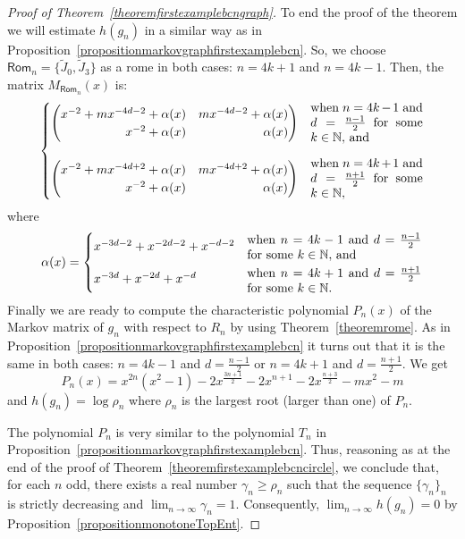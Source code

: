 \documentclass[a4paper, 11pt]{amsart}
\numberwithin{equation}{section}
\theoremstyle{customnumberedtheorem}
\theoremstyle{definitionwithbfnote}
\newcommand{\N}{\ensuremath{\mathbb{N}}}
\begin{document}
\begin{proof}[Proof of Theorem~\ref{theoremfirstexamplebcngraph}]
To end the proof of the theorem we will estimate $h(g_n)$
in a similar way as in
Proposition~\ref{propositionmarkovgraphfirstexamplebcn}.
So, we  choose
$\textsf{Rom}_n = \{\widetilde{J}_0, \widetilde{J}_3\}$
as a rome in both cases: $n = 4k + 1$ and $n = 4k - 1.$
Then, the matrix $M_{\textsf{Rom}_n}(x)$ is:
\[
 \begin{cases}
   \begin{pmatrix*}[r]
        x^{-2} + m x^{-4d-2} +\alpha(x) & m x^{-4d-2} +\alpha(x)\\
        x^{-2}  +\alpha(x)            & \alpha(x)
   \end{pmatrix*} & \text{\parbox{9em}{when $n=4k-1$ and $d=\tfrac{n-1}{2}$ for some $k \in \N,$ and}}\\[5ex]
   \begin{pmatrix*}[r]
         x^{-2} + m x^{-4d+2} +  \alpha(x) & m x^{-4d+2} +\alpha(x)\\
         x^{-2}   +\alpha(x)             & \alpha(x)
  \end{pmatrix*} & \text{\parbox{9em}{when $n=4k+1$ and $d=\tfrac{n+1}{2}$ for some $k \in \N,$}}
\end{cases}
\]
where
\[
 \alpha(x) = \begin{cases}
   x^{-3d -2} +x^{-2d-2}+x^{-d-2}& \text{\parbox{14em}{when $n=4k-1$ and $d=\tfrac{n-1}{2}$ for some $k \in \N,$ and}}\\[2ex]
   x^{-3d} +x^{-2d} +x^{-d} & \text{\parbox{14em}{when $n=4k+1$ and $d=\tfrac{n+1}{2}$ for some $k \in \N.$}}
\end{cases}
\]
Finally we are ready to compute the characteristic polynomial
$P_n(x)$ of the Markov matrix of $g_n$ with respect to $R_n$
by using Theorem~\ref{theoremrome}. As in
Proposition~\ref{propositionmarkovgraphfirstexamplebcn}
it turns out that it is the same in both cases:
$n=4k-1$ and $d=\tfrac{n-1}{2}$ or
$n=4k+1$ and $d=\tfrac{n+1}{2}.$
We get
\[
  P_n(x)  = x^{2n}(x^2 - 1) -2x^{\frac{3n+1}{2}} -2x^{n+1}-2x^{\frac{n+3}{2}} -mx^2 -m
\]
and $h(g_n) = \log \rho_n$ where $\rho_n$
is the largest root (larger than one) of $P_n.$

The polynomial $P_n$ is very similar to the polynomial $T_n$ in
Proposition~\ref{propositionmarkovgraphfirstexamplebcn}.
Thus, reasoning as at the end of the proof of
Theorem~\ref{theoremfirstexamplebcncircle},
we conclude that, for each $n$ odd,
there exists a real number $\gamma_n \ge \rho_n$ such that
the sequence $\{\gamma_n\}_n$ is strictly decreasing and
$\lim_{n\to\infty} \gamma_n = 1.$
Consequently, $\lim_{n\to\infty} h(g_n) = 0$
by Proposition~\ref{propositionmonotoneTopEnt}.
\end{proof}
\end{document}
